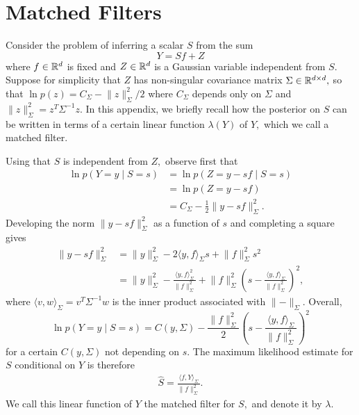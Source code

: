 \section{Matched Filters \label{appendix:matched}}

Consider the problem of inferring a scalar $S$ from the sum
$$
Y = S f + Z
$$
where $f \in \mathbb{R}^d$ is fixed and $Z \in \mathbb{R}^d$ is a Gaussian variable independent from $S.$ Suppose for simplicity that $Z$ has non-singular covariance matrix $\Sigma \in \mathbb{R}^{d \times d},$ so that $\ln p(z) = C_\Sigma - \lVert z \rVert_\Sigma^2 / 2$ where $C_\Sigma$ depends only on $\Sigma$ and $\lVert z \rVert_\Sigma^2 = z^T \Sigma^{-1} z.$ In this appendix, we briefly recall how the posterior on $S$ can be written in terms of a certain linear function $\lambda(Y)$ of $Y,$ which we call a matched filter.

Using that $S$ is independent from $Z,$ observe first that
\begin{align}
	\ln p(Y = y \mid S = s)
	 & = \ln p(Z = y - s f \mid S = s) \nonumber \\
	 & = \ln p(Z = y - s f) \nonumber \\
	& = C_\Sigma - \frac 1 2 \lVert y - s f \rVert^2_\Sigma.
\end{align}
Developing the norm $\lVert y - s f \rVert^2_\Sigma$ as a function of $s$ and completing a square gives
\begin{align*}
\lVert y - s f \rVert^2_\Sigma & = \lVert y \rVert^2_\Sigma - 2 \langle y,  f \rangle_\Sigma s + \lVert f \rVert^2_\Sigma s^2 \\
& = \lVert y \rVert^2_\Sigma - \frac{\langle y, f \rangle_\Sigma^2}{\lVert f \rVert^2_\Sigma} + \lVert f \rVert_\Sigma^2 \left (s - \frac{\langle y, f \rangle_\Sigma}{\lVert f \rVert_\Sigma^2} \right)^2,
\end{align*}
where $\langle v, w \rangle_\Sigma =  v^T \Sigma^{-1} w$ is the inner product associated with $\lVert - \rVert_\Sigma.$ Overall,
$$
\ln p(Y = y \mid S = s) = C(y, \Sigma) - \frac {\lVert f \rVert^2_\Sigma} 2 \left( s - \frac{\langle y, f \rangle_\Sigma}{\lVert f \rVert_\Sigma^2} \right)^2
$$
for a certain $C(y, \Sigma)$ not depending on $s.$ The maximum likelihood estimate for $S$ conditional on $Y$ is therefore
\begin{align*}
	\hat S = \frac{\langle f, Y \rangle_\Sigma}{\lVert f \rVert_\Sigma^2}.
\end{align*}
We call this linear function of $Y$ the matched filter for $S,$ and denote it by $\lambda.$


